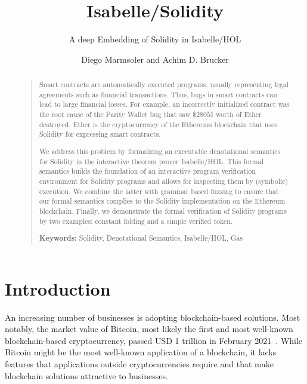 \documentclass[10pt,DIV17,a4paper,abstract=true,twoside=semi,openright]
{scrreprt}
\title{Isabelle/Solidity}
\subtitle{A deep Embedding of Solidity in Isabelle/HOL}
\author{Diego Marmsoler\textsuperscript{\orcidlink{0000-0003-2859-7673}}  
        and 
        Achim D. Brucker\textsuperscript{\orcidlink{0000-0002-6355-1200}}}%
\newenvironment{frontmatter}{}{}
\begin{document}
\begin{frontmatter}
\maketitle
\begin{abstract}
  \begin{quote}
    Smart contracts are automatically executed programs, usually representing
    legal agreements such as financial transactions. Thus, bugs in smart
    contracts can lead to large financial losses. For example, an incorrectly
    initialized contract was the root cause of the Parity Wallet bug that saw
    \$280M worth of Ether destroyed. Ether is the cryptocurrency of the
    Ethereum blockchain that uses Solidity for expressing smart contracts.

    We address this problem by formalizing an executable denotational semantics
    for Solidity in the interactive theorem prover Isabelle/HOL.  This formal
    semantics builds the foundation of an interactive program verification
    environment for Solidity programs and allows for inspecting them by
    (symbolic) execution. We combine the latter with grammar based fuzzing to
    ensure that our formal semantics complies to the Solidity implementation on
    the Ethereum blockchain.  Finally, we demonstrate the formal verification of
    Solidity programs by two examples: constant folding and a simple verified
    token.

      \bigskip
      \noindent\textbf{Keywords:} {Solidity, Denotational Semantics,
          Isabelle/HOL, Gas} 
  \end{quote}
\end{abstract}

\tableofcontents
\cleardoublepage
\end{frontmatter}


\chapter{Introduction}
An increasing number of businesses is adopting blockchain-based solutions. Most
notably, the market value of Bitcoin, most likely the first and most well-known
blockchain-based cryptocurrency, passed USD 1 trillion in February
2021~\cite{coinmarket}. While Bitcoin might be the most well-known application
of a blockchain, it lacks features that applications outside cryptocurrencies
require and that make blockchain solutions attractive to businesses.
\end{document}
